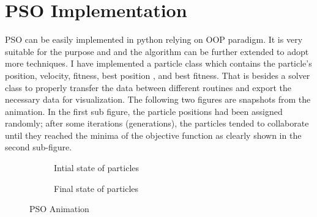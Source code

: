 \section{PSO Implementation}
PSO can be easily implemented in python  relying on OOP paradigm. It is very suitable for the purpose and and the algorithm can be further extended to adopt more techniques. I have implemented a particle class which contains the particle’s position, velocity, fitness, best position , and best fitness. That is besides a solver class to properly transfer the data between different  routines and export the necessary data for visualization. The following two figures are snapshots from the animation. In the first sub figure, the particle positions had been assigned randomly; after some iterations (generations), the particles tended to collaborate until they reached the minima of the objective function as clearly shown in the second sub-figure.
\begin{figure}[htp]
\begin{subfigure}{0.5\textwidth}
    \centering
   \scalebox{.6}{}
  \caption{Intial state of particles}
  \label{fig:sub1}
\end{subfigure}%
\begin{subfigure}{0.5\textwidth}
 \centering
   \scalebox{.6}{}
  \caption{Final state of particles}
  \label{fig:sub2}
\end{subfigure}
\caption{PSO Animation}
\label{fig:test}
\end{figure}

